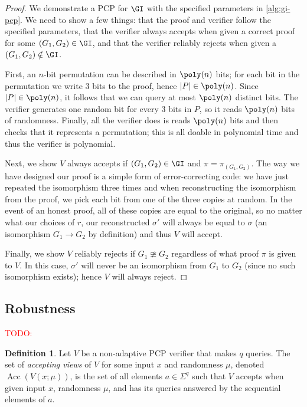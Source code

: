 \documentclass[english,12pt]{reedthesis}
\theoremstyle{plain}
\theoremstyle{definition}
\newtheorem{defn}[defn]{Definition}
\theoremstyle{remark}
\DeclareMathOperator{\Acc}{Acc}
\DeclarePairedDelimiter{\abs}{\lvert}{\rvert}
\newcommand{\TODO}[1]{\textcolor{red}{TODO: #1}}
\begin{document}
\begin{proof}
  We demonstrate a PCP for $\GI$ with the specified parameters in
  \cref{alg:gi-pcp}. We need to show a few things: that the proof and verifier
  follow the specified parameters, that the verifier always accepts when given a
  correct proof for some $(G_{1}, G_{2}) \in \GI$, and that the verifier reliably
  rejects when given a $(G_{1}, G_{2}) \notin \GI$.

  First, an $n$-bit permutation can be described in $\poly(n)$ bits; for each
  bit in the permutation we write 3 bits to the proof, hence
  $\abs{P} \in \poly(n)$. Since $\abs{P} \in \poly(n)$, it follows that we can query
  at most $\poly(n)$ distinct bits. The verifier generates one random bit for
  every 3 bits in $P$, so it reads $\poly(n)$ bits of randomness. Finally, all
  the verifier does is reads $\poly(n)$ bits and then checks that it represents
  a permutation; this is all doable in polynomial time and thus the verifier is
  polynomial.

  Next, we show $V$ always accepts if $(G_{1}, G_{2}) \in \GI$ and
  $\pi = \pi_{(G_{1}, G_{2})}$. The way we have designed our proof is a simple form
  of error-correcting code: we have just repeated the isomorphism three times
  and when reconstructing the isomorphism from the proof, we pick each bit from
  one of the three copies at random. In the event of an honest proof, all of
  these copies are equal to the original, so no matter what our choices of $r$,
  our reconstructed $\sigma'$ will always be equal to $\sigma$ (an isomorphism
  $G_{1} \rightarrow G_{2}$ by definition) and thus $V$ will accept.

  Finally, we show $V$ reliably rejects if $G_{1} \ncong G_{2}$ regardless of what
  proof $\pi$ is given to $V$. In this case, $\sigma'$ will never be an isomorphism
  from $G_{1}$ to $G_{2}$ (since no such isomorphism exists); hence $V$ will
  always reject.
\end{proof}

\subsection{Robustness}\label{sec:robust-verifiers}

\TODO{}

\begin{defn}\label{def:acc(v)}\index{Acc@$\Acc$}
  Let $V$ be a non-adaptive PCP verifier that makes $q$ queries. The set of
  \emph{accepting views} of $V$ for some input $x$ and randomness $\mu$, denoted
  $\Acc(V(x; \mu))$, is the set of all elements $a \in \Sigma^{q}$ such that $V$ accepts
  when given input $x$, randomness $\mu$, and has its queries answered by the
  sequential elements of $a$.
\end{defn}
\end{document}
